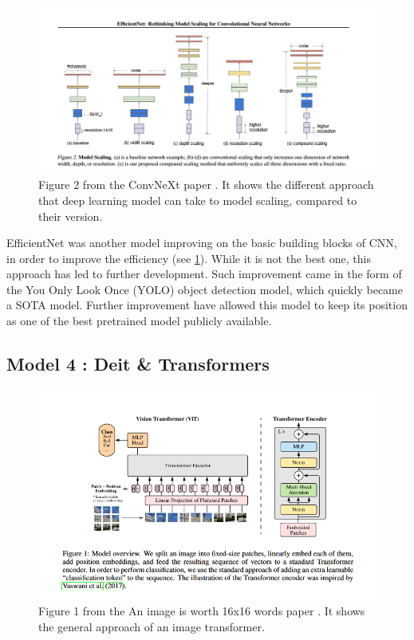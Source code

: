 \documentclass[11pt]{article}
\begin{document}
\begin{figure}[h]

     \centering
     \includegraphics[width=0.8 \textwidth]{plots/efficientnet}
     \caption{Figure 2 from the ConvNeXt paper \cite{efficientnet}. It shows the different approach that deep learning
     model can take to model scaling, compared to their version.}
     \label{fig:efficientnet}

\end{figure}

    EfficientNet was another model improving on the basic building blocks of CNN, in order to improve the efficiency (see \ref{fig:efficientnet}). While it is
    not the best one, this approach has led to further development. Such improvement came in the form of the You Only Look Once (YOLO) object detection
    model, which quickly became a SOTA model. Further improvement have allowed this model to keep its position as one of the best pretrained model publicly available.

    \subsection{Model 4 : Deit \& Transformers \cite{deit} \cite{image16x16}}


        \begin{figure}[h!]

             \centering
             \includegraphics[width=0.8 \textwidth]{plots/transformer}
             \caption{Figure 1 from the An image is worth 16x16 words paper \cite{image16x16}. It shows the general approach of an image transformer.}
             \label{fig:transformer}

        \end{figure}
\end{document}
